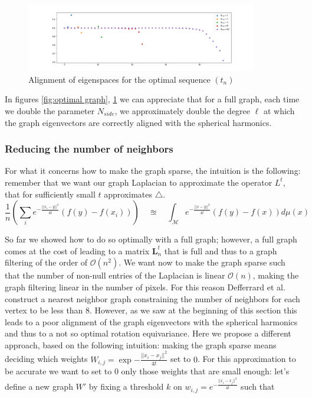 \begin{figure}[h]
	\centering
	\includegraphics[width=0.9\textwidth]{../codes/02.HeatKernelGraphLaplacian/HEALPix/06_figures/optimal_full_diagonal.png}
	\caption{\label{fig:optimal graph diagonal}Alignment of eigenspaces for the optimal sequence $(t_n)$}	
\end{figure}
In figures \ref{fig:optimal graph}, \ref{fig:optimal graph diagonal} we can appreciate that for a full graph, each time we double the parameter $N_{side}$, we approximately double the degree $\ell$ at which the graph eigenvectors are correctly aligned with the spherical harmonics.
\subsubsection{Reducing the number of neighbors}
For what it concerns how to make the graph sparse, the intuition is the following: remember that we want our graph Laplacian to approximate the operator $L^t$, that for sufficiently small $t$ approximates $\triangle$.
$$\frac{1}{n}\left(\sum_i e^{-\frac{||x_i-y||^2}{4t}}(f(y)-f(x_i)) \right) \quad \approxeq \quad \int_\mathcal M e^{-\frac{||x-y||^2}{4t}}\left(f(y)-f(x)\right)d\mu(x) $$

So far we showed how to do so optimally with a full graph; however, a full graph comes at the cost of leading to a matrix $\mathbf L_n^t$ that is full and thus to a graph filtering of the order of $\mathcal O(n^2)$. We want now to make the graph sparse such that the number of non-null entries of the Laplacian is linear $\mathcal O (n)$, making the graph filtering linear in the number of pixels. For this reason Defferrard et al. construct a nearest neighbor graph constraining the number of neighbors for each vertex to be less than 8. However, as we saw at the beginning of this section this leads to a poor alignment of the graph eigenvectors with the spherical harmonics and thus to a not so optimal rotation equivariance. Here we propose a different approach, based on the following intuition: making the graph sparse means deciding which weights $W_{i,j}=\exp{-\frac{||x_i-x_j||^2}{4t}}$ set to $0$. For this approximation to be accurate we want to set to 0 only those weights that are small enough: let's define a new graph $W'$ by fixing a threshold $k$ on $w_{i,j}=e^{-\frac{||x_i-x_j||^2}{4t}}$ such that

